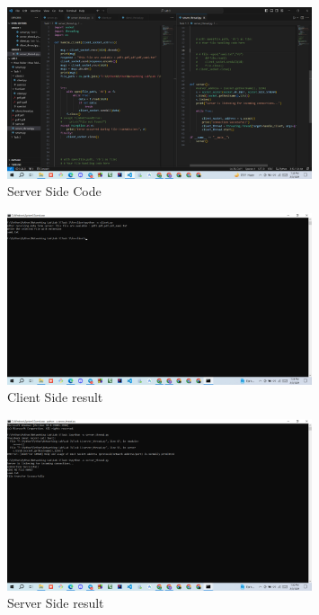 \documentclass[11pt]{article}
\begin{document}
\begin{itemize}
    \begin{figure}[H]
        \centering
        \includegraphics[width=0.8\textwidth]{server.png}
        \caption{Server Side Code}
        \label{fig:2}
    \end{figure}
    
    \begin{figure}[H]
      \centering
      \includegraphics[width=0.8\textwidth]{client_result.png}
      \caption{Client Side result}
      \label{fig:3}
    \end{figure}
    
    \begin{figure}[H]
      \centering
      \includegraphics[width=0.8\textwidth]{server_result.png}
      \caption{Server Side result}
      \label{fig:4}
    \end{figure}

\end{itemize}
\end{document}
